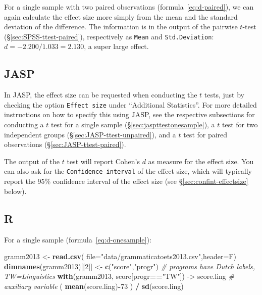 \documentclass[
]{book}
\newenvironment{Shaded}{\begin{snugshade}}{\end{snugshade}}
\newcommand{\CommentTok}[1]{\textcolor[rgb]{0.56,0.35,0.01}{\textit{#1}}}
\newcommand{\DataTypeTok}[1]{\textcolor[rgb]{0.13,0.29,0.53}{#1}}
\newcommand{\DecValTok}[1]{\textcolor[rgb]{0.00,0.00,0.81}{#1}}
\newcommand{\KeywordTok}[1]{\textcolor[rgb]{0.13,0.29,0.53}{\textbf{#1}}}
\newcommand{\NormalTok}[1]{#1}
\newcommand{\OperatorTok}[1]{\textcolor[rgb]{0.81,0.36,0.00}{\textbf{#1}}}
\newcommand{\StringTok}[1]{\textcolor[rgb]{0.31,0.60,0.02}{#1}}
\begin{document}
For a single sample with two paired observations
(formula~\eqref{eq:d-paired}), we can again calculate the effect
size more simply from the mean and the standard deviation of the difference.
The information is in the output of the pairwise \(t\)-test\\
(§\ref{sec:SPSS-ttest-paired}), respectively as \texttt{Mean} and
\texttt{Std.Deviation}:\\
\(d = -2.200 / 1.033 = 2.130\), a super large effect.

\hypertarget{jasp-12}{%
\subsection{JASP}\label{jasp-12}}

In JASP, the effect size can be requested when conducting the \(t\) tests, just by checking the option \texttt{Effect\ size} under ``Additional Statistics''. For more detailed instructions on how to specify this using JASP, see the respective subsections for conducting a \(t\) test for a single sample (§\ref{sec:jaspttestonesample}), a \(t\) test for two independent groups (§\ref{sec:JASP-ttest-unpaired}), and a \(t\) test for paired observations (§\ref{sec:JASP-ttest-paired}).

The output of the \(t\) test will report Cohen's \(d\) as measure for the effect size. You can also ask for the \texttt{Confidence\ interval} of the effect size, which will typically report the 95\% confidence interval of the effect size (see §\ref{sec:confint-effectsize} below).

\hypertarget{r-13}{%
\subsection{R}\label{r-13}}

For a single sample
(formula~\eqref{eq:d-onesample}):\\

\begin{Shaded}
\begin{Highlighting}[]
\NormalTok{gramm2013 \textless{}{-}}\StringTok{ }\KeywordTok{read.csv}\NormalTok{( }\DataTypeTok{file=}\StringTok{"data/grammaticatoets2013.csv"}\NormalTok{,}\DataTypeTok{header=}\NormalTok{F)}
\KeywordTok{dimnames}\NormalTok{(gramm2013)[[}\DecValTok{2}\NormalTok{]] \textless{}{-}}\StringTok{ }\KeywordTok{c}\NormalTok{(}\StringTok{"score"}\NormalTok{,}\StringTok{"progr"}\NormalTok{)}
\CommentTok{\# programs have Dutch labels, TW=Linguistics}
\KeywordTok{with}\NormalTok{(gramm2013, score[progr}\OperatorTok{==}\StringTok{"TW"}\NormalTok{]) {-}\textgreater{}}\StringTok{ }\NormalTok{score.ling}
\CommentTok{\# auxiliary variable}
\NormalTok{( }\KeywordTok{mean}\NormalTok{(score.ling)}\OperatorTok{{-}}\DecValTok{73}\NormalTok{ ) }\OperatorTok{/}\StringTok{ }\KeywordTok{sd}\NormalTok{(score.ling) }
\end{Highlighting}
\end{Shaded}
\end{document}
